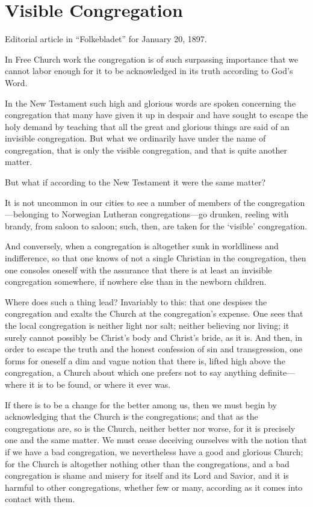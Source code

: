 
\section{Visible Congregation}

Editorial article in “Folkebladet” for January 20, 1897.

In Free Church work the congregation is of such surpassing importance that we cannot labor enough for it to be acknowledged in its truth according to God’s Word.

In the New Testament such high and glorious words are spoken concerning the congregation that many have given it up in despair and have sought to escape the holy demand by teaching that all the great and glorious things are said of an invisible congregation. But what we ordinarily have under the name of congregation, that is only the visible congregation, and that is quite another matter.

But what if according to the New Testament it were the same matter?

It is not uncommon in our cities to see a number of members of the congregation—belonging to Norwegian Lutheran congregations—go drunken, reeling with brandy, from saloon to saloon; such, then, are taken for the ‘visible’ congregation.

And conversely, when a congregation is altogether sunk in worldliness and indifference, so that one knows of not a single Christian in the congregation, then one consoles oneself with the assurance that there is at least an invisible congregation somewhere, if nowhere else than in the newborn children.

Where does such a thing lead? Invariably to this: that one despises the congregation and exalts the Church at the congregation’s expense. One sees that the local congregation is neither light nor salt; neither believing nor living; it surely cannot possibly be Christ’s body and Christ’s bride, as it is. And then, in order to escape the truth and the honest confession of sin and transgression, one forms for oneself a dim and vague notion that there is, lifted high above the congregation, a Church about which one prefers not to say anything definite—where it is to be found, or where it ever was.

If there is to be a change for the better among us, then we must begin by acknowledging that the Church is the congregations; and that as the congregations are, so is the Church, neither better nor worse, for it is precisely one and the same matter. We must cease deceiving ourselves with the notion that if we have a bad congregation, we nevertheless have a good and glorious Church; for the Church is altogether nothing other than the congregations, and a bad congregation is shame and misery for itself and its Lord and Savior, and it is harmful to other congregations, whether few or many, according as it comes into contact with them.

